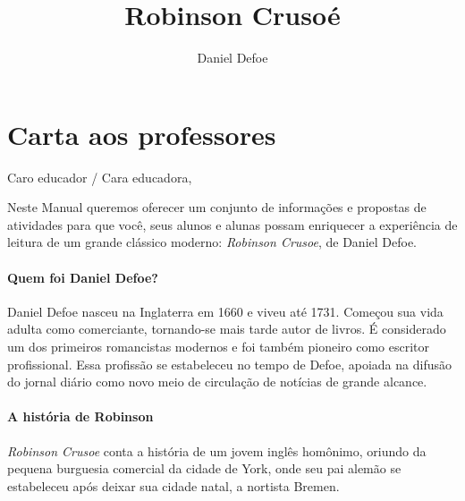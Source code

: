 \documentclass{article}
\begin{document}
\newcommand{\AutorLivro}{Daniel Defoe}
\newcommand{\TituloLivro}{Robinson Crusoé}
\newcommand{\Tema}{Ficção, mistério e fantasia}
\newcommand{\Genero}{Romance}
\newcommand{\issnppub}{---}
\newcommand{\issnepub}{---}
\newcommand{\colaborador}{\textbf{Iuri Pereira} é uma pessoa incrível e vai fazer um bom serviço.}


\title{\TituloLivro}
\author{\AutorLivro}
\def\authornotes{\colaborador}

\date{}
\maketitle
\tableofcontents

\pagebreak

\section{Carta aos professores}

Caro educador / Cara educadora,\\\bigskip

\reversemarginpar
\marginparwidth=5cm

Neste Manual queremos oferecer um conjunto de informações e propostas de
atividades para que você, seus alunos e alunas possam enriquecer a
experiência de leitura de um grande clássico moderno: \emph{Robinson
Crusoe}, de Daniel Defoe.

\paragraph{Quem foi Daniel Defoe?}
Daniel Defoe nasceu na Inglaterra em 1660 e viveu até 1731. Começou sua
vida adulta como comerciante, tornando-se mais tarde autor de livros. É
considerado um dos primeiros romancistas modernos e foi também pioneiro
como escritor profissional. Essa profissão se estabeleceu no tempo de
Defoe, apoiada na difusão do jornal diário como novo meio de circulação
de notícias de grande alcance.

\paragraph{A história de Robinson}
\emph{Robinson Crusoe} conta a história de um jovem inglês homônimo,
oriundo da pequena burguesia comercial da cidade de York, onde seu pai
alemão se estabeleceu após deixar sua cidade natal, a nortista Bremen.
\end{document}
